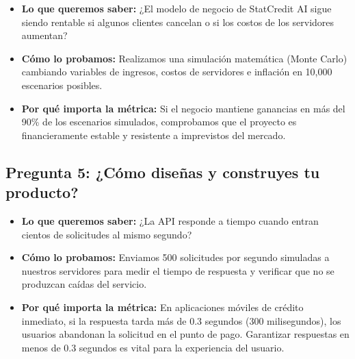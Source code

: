 \documentclass[11pt,a4paper]{article}
\begin{document}
\begin{tcolorbox}[colback=lightgray,colframe=secondary,title=\textbf{Experimento 4.2: Simulación de estabilidad financiera (Monte Carlo)}]
\begin{itemize}[leftmargin=*]
    \item \textbf{Lo que queremos saber:} ¿El modelo de negocio de StatCredit AI sigue siendo rentable si algunos clientes cancelan o si los costos de los servidores aumentan?
    \item \textbf{Cómo lo probamos:} Realizamos una simulación matemática (Monte Carlo) cambiando variables de ingresos, costos de servidores e inflación en 10,000 escenarios posibles.
    \item \textbf{Por qué importa la métrica:} Si el negocio mantiene ganancias en más del 90\% de los escenarios simulados, comprobamos que el proyecto es financieramente estable y resistente a imprevistos del mercado.
\end{itemize}
\end{tcolorbox}

\subsection{Pregunta 5: ¿Cómo diseñas y construyes tu producto?}

\begin{tcolorbox}[colback=lightgray,colframe=secondary,title=\textbf{Experimento 5.1: Prueba de velocidad y carga del sistema}]
\begin{itemize}[leftmargin=*]
    \item \textbf{Lo que queremos saber:} ¿La API responde a tiempo cuando entran cientos de solicitudes al mismo segundo?
    \item \textbf{Cómo lo probamos:} Enviamos 500 solicitudes por segundo simuladas a nuestros servidores para medir el tiempo de respuesta y verificar que no se produzcan caídas del servicio.
    \item \textbf{Por qué importa la métrica:} En aplicaciones móviles de crédito inmediato, si la respuesta tarda más de 0.3 segundos (300 milisegundos), los usuarios abandonan la solicitud en el punto de pago. Garantizar respuestas en menos de 0.3 segundos es vital para la experiencia del usuario.
\end{itemize}
\end{tcolorbox}
\end{document}

